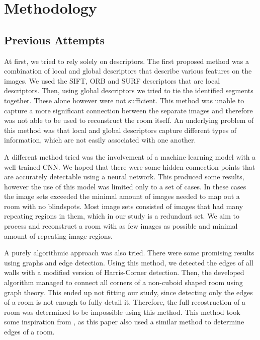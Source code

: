 \section{Methodology}
\label{sec:methodology}

\subsection{Previous Attempts} %
At first, we tried to rely solely on descriptors. The first proposed method was a combination of local and global descriptors that describe various features on the images. We used the SIFT, ORB and SURF descriptors that are local descriptors. Then, using global descriptors we tried to tie the identified segments together. These alone however were not sufficient. This method was unable to capture a more significant connection between the separate images and therefore was not able to be used to reconstruct the room itself. An underlying problem of this method was that local and global descriptors capture different types of information, which are not easily associated with one another.

A different method tried was the involvement of a machine learning model with a well-trained CNN. We hoped that there were some hidden connection points that are accurately detectable using a neural network. This produced some results, however the use of this model was limited only to a set of cases. In these cases the image sets exceeded the minimal amount of images needed to map out a room with no blindspots. Most image sets consisted of images that had many repeating regions in them, which in our study is a redundant set. We aim to process and reconstruct a room with as few images as possible and minimal amount of repeating image regions.   

A purely algorithmic approach was also tried. There were some promising results using graphs and edge detection. Using this method, we detected the edges of all walls with a modified version of Harris-Corner detection. Then, the developed algorithm managed to connect all corners of a non-cuboid shaped room using graph theory. This ended up not fitting our study, since detecting only the edges of a room is not enough to fully detail it. Therefore, the full recostruction of a room was determined to be impossible using this method. This method took some inspiration from \cite{9707088}, as this paper also used a similar method to determine edges of a room.


